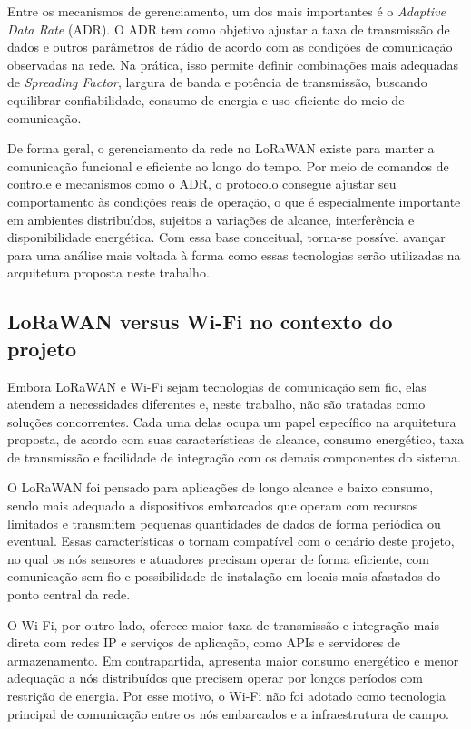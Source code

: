 Entre os mecanismos de gerenciamento, um dos mais importantes é o \textit{Adaptive Data Rate} (ADR). O ADR tem como objetivo ajustar a taxa de transmissão de dados e outros parâmetros de rádio de acordo com as condições de comunicação observadas na rede. Na prática, isso permite definir combinações mais adequadas de \textit{Spreading Factor}, largura de banda e potência de transmissão, buscando equilibrar confiabilidade, consumo de energia e uso eficiente do meio de comunicação.

De forma geral, o gerenciamento da rede no LoRaWAN existe para manter a comunicação funcional e eficiente ao longo do tempo. Por meio de comandos de controle e mecanismos como o ADR, o protocolo consegue ajustar seu comportamento às condições reais de operação, o que é especialmente importante em ambientes distribuídos, sujeitos a variações de alcance, interferência e disponibilidade energética. Com essa base conceitual, torna-se possível avançar para uma análise mais voltada à forma como essas tecnologias serão utilizadas na arquitetura proposta neste trabalho.


\subsection{LoRaWAN versus Wi-Fi no contexto do projeto}

Embora LoRaWAN e Wi-Fi sejam tecnologias de comunicação sem fio, elas atendem a necessidades diferentes e, neste trabalho, não são tratadas como soluções concorrentes. Cada uma delas ocupa um papel específico na arquitetura proposta, de acordo com suas características de alcance, consumo energético, taxa de transmissão e facilidade de integração com os demais componentes do sistema.

O LoRaWAN foi pensado para aplicações de longo alcance e baixo consumo, sendo mais adequado a dispositivos embarcados que operam com recursos limitados e transmitem pequenas quantidades de dados de forma periódica ou eventual. Essas características o tornam compatível com o cenário deste projeto, no qual os nós sensores e atuadores precisam operar de forma eficiente, com comunicação sem fio e possibilidade de instalação em locais mais afastados do ponto central da rede.

O Wi-Fi, por outro lado, oferece maior taxa de transmissão e integração mais direta com redes IP e serviços de aplicação, como APIs e servidores de armazenamento. Em contrapartida, apresenta maior consumo energético e menor adequação a nós distribuídos que precisem operar por longos períodos com restrição de energia. Por esse motivo, o Wi-Fi não foi adotado como tecnologia principal de comunicação entre os nós embarcados e a infraestrutura de campo.

